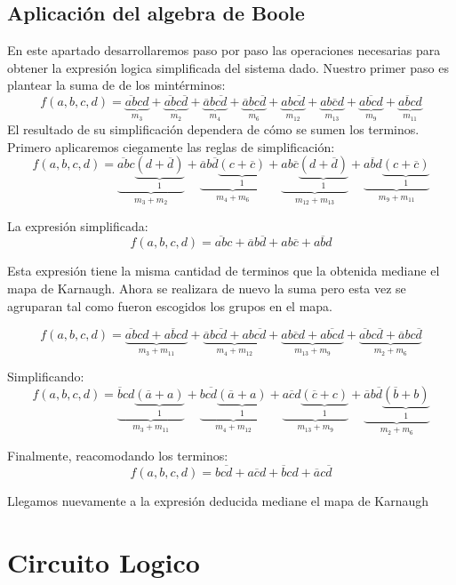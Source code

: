 \subsection{Aplicaci\'on del algebra de Boole}
\indent En este apartado desarrollaremos paso por paso las operaciones necesarias para obtener la expresión logica simplificada del sistema dado.
\indent 
Nuestro primer paso es plantear la suma de de los mintérminos:
\[f(a,b,c,d)= \underbrace{\overline{ab}cd}_{m_3}+
			  \underbrace{\overline{ab}c\overline{d}}_{m_2}
			 +\underbrace{\overline{a}b\overline{cd}}_{m_4}
			 +\underbrace{\overline{a}bc\overline{d}}_{m_6}
			 +\underbrace{ab\overline{cd}}_{m_{12}}
			 +\underbrace{ab\overline{c}d}_{m_{13}}
			 +\underbrace{a\overline{bc}d}_{m_9} 
			 +\underbrace{a\overline{b}cd}_{m_{11}}
			 \]
El resultado de su simplificación dependera de cómo se sumen los terminos. 
Primero aplicaremos ciegamente las reglas de simplificación:
\[ 
	f(a,b,c,d)= \underbrace{\overline{ab}c\underbrace{\left(d+ \overline{d}\right)}_{1}}_{m_3 +m_2}
	+
	\underbrace{\overline{a}b\overline{d}\underbrace{\left(c+ \overline{c}\right)}_{1}}_{m_4 +m_6}
	+
	\underbrace{ab\overline{c}\underbrace{\left(d+ \overline{d}\right)}_{1}}_{m_{12} +m_{13}}
	+
	\underbrace{a\overline{b}d\underbrace{\left(c+ \overline{c}\right)}_{1}}_{m_9 +m_{11}}
\]

La expresión simplificada:
\[ 
	f(a,b,c,d)= 
	\overline{ab}c
	+
	\overline{a}b\overline{d}
	+
	ab\overline{c}
	+
	a\overline{b}d
\]


Esta expresión tiene la misma cantidad de terminos que la obtenida mediane el mapa de Karnaugh. 
Ahora se realizara de nuevo la suma pero esta vez se agruparan tal como fueron escogidos los grupos en el mapa.

$$
f(a,b,c,d)= 
\underbrace{\overline{ab}cd + a\overline{b}cd}_{m_3 + m_{11}}
+
\underbrace{\overline{a}b\overline{cd} + ab\overline{cd}}_{m_4+m_{12}}
+
\underbrace{ab\overline{c}d + a\overline{bc}d }_{m_{13} + m_{9}}
+
\underbrace{\overline{ab}c\overline{d} + \overline{a}bc\overline{d}}_{m_2 + m_6}
$$

Simplificando:
$$f(a,b,c,d)= 
\underbrace{\overline{b}cd\underbrace{\left(\overline{a}+a\right)}_{1}}_{m_3 + m_{11}}
+\underbrace{b\overline{cd}\underbrace{\left(\overline{a}+a\right)}_{1}}_{m_4+m_{12}}
+
\underbrace{a\overline{c}d\underbrace{\left(\overline{c}+c\right)}_{1} }_{m_{13} + m_{9}}
+
\underbrace{\overline{a}b\overline{d}\underbrace{\left(\overline{b}+b\right)}_{1}}_{m_2 + m_6}$$


Finalmente, reacomodando los terminos:
\[
	f(a,b,c,d)= b\overline{cd} + a\overline{c}d +
				\overline{b}cd +\overline{a}c\overline{d}
\]

Llegamos nuevamente a la expresión deducida mediane el mapa de 
Karnaugh

\section{Circuito Logico}



